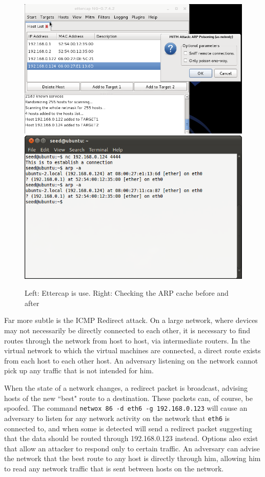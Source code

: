 \begin{figure}
    \centering
    \includegraphics[width=.5\linewidth]{images/ettercap.png}
    \includegraphics[width=.45\linewidth]{images/arp.png}
    \caption{Left: Ettercap is use. Right: Checking the ARP cache before and after}
    \label{fig:etterarp}
\end{figure}

Far more subtle is the ICMP Redirect attack. On a large network, where devices may not necessarily be directly connected
to each other, it is necessary to find routes through the network from host to host, via intermediate routers. In the
virtual network to which the virtual machines are connected, a direct route exists from each host to each other host. An
adversary listening on the network cannot pick up any traffic that is not intended for him.


When the state of a network changes, a redirect packet is broadcast, advising hosts of the new ``best" route to a
destination. These packets can, of course, be spoofed. The command {\tt netwox 86 -d eth6 -g 192.168.0.123} will cause
an adversary to listen for any network activity on the network that {\tt eth6} is connected to, and when some is
detected will send a redirect packet suggesting that the data should be routed through 192.168.0.123 instead. Options
also exist that allow an attacker to respond only to certain traffic. An adversary can advise the network that the best
route to any host is directly through him, allowing him to read any network traffic that is sent between hosts on the
network.


